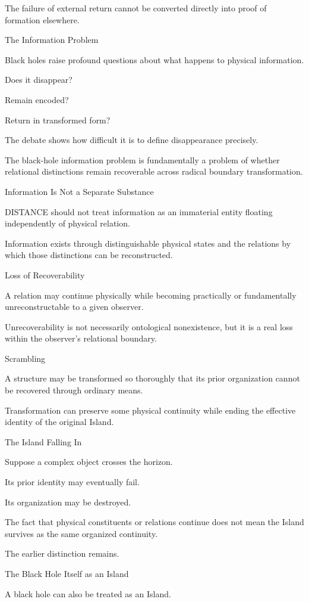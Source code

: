The failure of external return cannot be converted directly into proof of formation elsewhere.

The Information Problem

Black holes raise profound questions about what happens to physical information.

Does it disappear?

Remain encoded?

Return in transformed form?

The debate shows how difficult it is to define disappearance precisely.

The black-hole information problem is fundamentally a problem of whether relational distinctions remain recoverable across radical boundary transformation.

Information Is Not a Separate Substance

DISTANCE should not treat information as an immaterial entity floating independently of physical relation.

Information exists through distinguishable physical states and the relations by which those distinctions can be reconstructed.

Loss of Recoverability

A relation may continue physically while becoming practically or fundamentally unreconstructable to a given observer.

Unrecoverability is not necessarily ontological nonexistence, but it is a real loss within the observer’s relational boundary.

Scrambling

A structure may be transformed so thoroughly that its prior organization cannot be recovered through ordinary means.

Transformation can preserve some physical continuity while ending the effective identity of the original Island.

The Island Falling In

Suppose a complex object crosses the horizon.

Its prior identity may eventually fail.

Its organization may be destroyed.

The fact that physical constituents or relations continue does not mean the Island survives as the same organized continuity.

The earlier distinction remains.

The Black Hole Itself as an Island

A black hole can also be treated as an Island.


